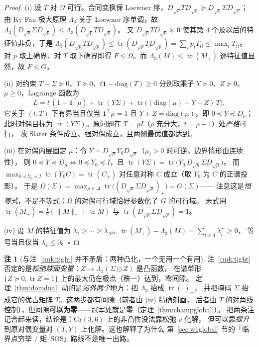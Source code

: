 \documentclass[UTF8,11pt]{ctexart}
\theoremstyle{definition}
\newtheorem{remark}[theorem]{注}
\newcommand{\Lam}{\Lambda}
\newcommand{\tr}{\operatorname{tr}}
\newcommand{\one}{\mathbf{1}}
\begin{document}
\begin{proof}
(i) 设 $T$ 对 $\Omega$ 可行。合同变换保 Loewner 序，$D_{\sqrt p}TD_{\sqrt p}\succeq D_{\sqrt p}\Sigma D_{\sqrt p}$；
由 Ky Fan 极大原理 $\Lam_3$ 关于 Loewner 序单调，故
$\Lam_3(D_{\sqrt p}\Sigma D_{\sqrt p})\le\Lam_3(D_{\sqrt p}TD_{\sqrt p})$。
又 $D_{\sqrt p}TD_{\sqrt p}\succeq0$ 使其第 $4$ 个及以后的特征值非负，于是
$\Lam_3(D_{\sqrt p}TD_{\sqrt p})\le\tr(D_{\sqrt p}TD_{\sqrt p})=\sum_ip_iT_{ii}\le\max_iT_{ii}$。
对 $p$ 取上确界、对 $T$ 取下确界即得 $F\le\Omega$。而 $\Lam_3(M)\le\tr(M_+)$ 逐特征值显然，故 $F\le G$。

(ii) 对约束 $T-\Sigma\succeq0$、$T\succeq0$、$t\one-\mathrm{diag}(T)\ge0$ 分别取乘子
$Y\succeq0$、$Z\succeq0$、$\mu\ge0$，Lagrange 函数为
\[
L=t\,(1-\one^\top\mu)+\tr(Y\Sigma)+\tr\bigl((\mathrm{diag}(\mu)-Y-Z)\,T\bigr),
\]
它关于 $(t,T)$ 下有界当且仅当 $\one^\top\mu=1$ 且 $Y+Z=\mathrm{diag}(\mu)$，即 $0\preceq Y\preceq D_\mu$；
此时对偶目标为 $\tr(Y\Sigma)$。原问题在 $T=\rho I$（$\rho$ 充分大，$t=\rho+1$）处\emph{严格}可行，
故 Slater 条件成立、强对偶成立，且两侧最优值都达到。

(iii) 在对偶内层固定 $\mu$：令 $Y=D_{\sqrt\mu}Y_0D_{\sqrt\mu}$（$\mu_i>0$ 时可逆，边界情形由连续性），
则 $0\preceq Y\preceq D_\mu\iff0\preceq Y_0\preceq I$，且 $\tr(Y\Sigma)=\tr\bigl(Y_0\,D_{\sqrt\mu}\Sigma D_{\sqrt\mu}\bigr)$。
而 $\max_{0\preceq Y_0\preceq I}\tr(Y_0C)=\tr(C_+)$ 对任意对称 $C$ 成立（取 $Y_0$ 为 $C$ 的正谱投影）。
于是 $\Omega(\Sigma)=\max_{\mu\in\Delta}\tr\bigl((D_{\sqrt\mu}\Sigma D_{\sqrt\mu})_+\bigr)=G(\Sigma)$——
注意这是\emph{恒等式}，不是不等式：$\Omega$ 的对偶可行域恰好参数化了 $G$ 的可行域。
末式用 $\tr(M_+)=\tfrac12(\|M\|_*+\tr M)$ 与 $\tr(D_{\sqrt p}\Sigma D_{\sqrt p})=1$。

(iv) 设 $M$ 的特征值为 $\lambda_1\ge\cdots\ge\lambda_N$。$\tr(M_+)-\Lam_3(M)=\sum_{i\ge4}\lambda_i^+\ge0$，
等号当且仅当 $\lambda_4\le0$。$\square$
\end{proof}

\begin{remark}[与注~\ref{rmk:tight} 并不矛盾：两种凸化，一个无用一个有用]\label{rmk:tworelax}
注~\ref{rmk:tight} 否定的是\emph{松弛球面变量}：$Z\mapsto\Lam_3(\Sigma\odot Z)$ 是凸函数，
在谱单形 $\{Z\succeq0,\tr Z=1\}$ 上的最大仍在极点（秩一）达到，零间隙。
定理~\ref{thm:domdual} 动的是\emph{另外两个}地方：把 $\Lam_3$ 抬成 $\tr(\cdot)_+$，
并把掩码 $\Sigma$ 抬成它的优占矩阵 $T$。这两步都有间隙（前者由 (iv) 精确刻画，
后者由 $T$ 的对角线控制），但间隙\textbf{可以为零}——冠军处就是零（定理~\ref{thm:champglobal}）。
把两条注记合起来读，结论是：$\mathrm{Gr}(3,6)$ 上的非凸性没法靠松弛 $v$ 化解，
但可以靠\emph{提升}到原对偶变量对 $(T,Y)$ 上化解。这也解释了为什么
第~\ref{sec:w1global} 节的「临界点穷举 / 矩--SOS」路线不是唯一出路。
\end{remark}
\end{document}
